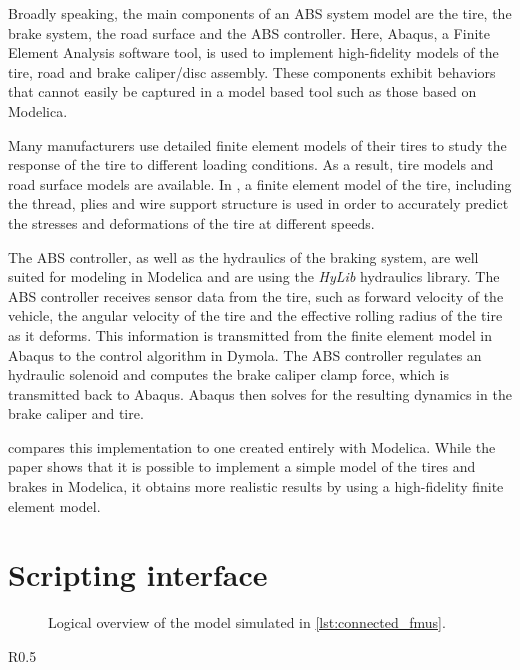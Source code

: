 \documentclass[\rootfolder/main.tex]{subfiles}
\begin{document}
Broadly speaking, the main components of an ABS system model are the tire, the brake system, the road surface and the ABS controller.
Here, Abaqus, a Finite Element Analysis software tool, is used to implement high-fidelity models of the tire, road and brake caliper/disc assembly.
These components exhibit behaviors that cannot easily be captured in a model based tool such as those based on Modelica.

Many manufacturers use detailed finite element models of their tires to study the response of the tire to different loading conditions.
As a result, tire models and road surface models are available.
In \cite{Schofield}, a finite element model of the tire, including the thread, plies and wire support structure is used in order to accurately predict the stresses and deformations of the tire at different speeds.

The ABS controller, as well as the hydraulics of the braking system, are well suited for modeling in Modelica and are using the \emph{HyLib} hydraulics library.
The ABS controller receives sensor data from the tire, such as forward velocity of the vehicle, the angular velocity of the tire and the effective rolling radius of the tire as it deforms.
This information is transmitted from the finite element model in Abaqus to the control algorithm in Dymola.
The ABS controller regulates an hydraulic solenoid and computes the brake caliper clamp force, which is transmitted back to Abaqus.
Abaqus then solves for the resulting dynamics in the brake caliper and tire.

\cite{Schofield} compares this implementation to one created entirely with Modelica.
While the paper shows that it is possible to implement a simple model of the tires and brakes in Modelica, it obtains more realistic results by using a high-fidelity finite element model.

\section{Scripting interface}

\begin{figure}[H]
    \caption{Logical overview of the model simulated in \cref{lst:connected_fmus}.\label{fig:fmi-connected}}
\end{figure}

\begin{wraptable}{R}{0.5\columnwidth}
    \inputminted[firstline=3, lastline=30]{Python}{\rootfolder/Chapters/Chapter3/Listings/simulate.py}
\end{wraptable}
\end{document}
